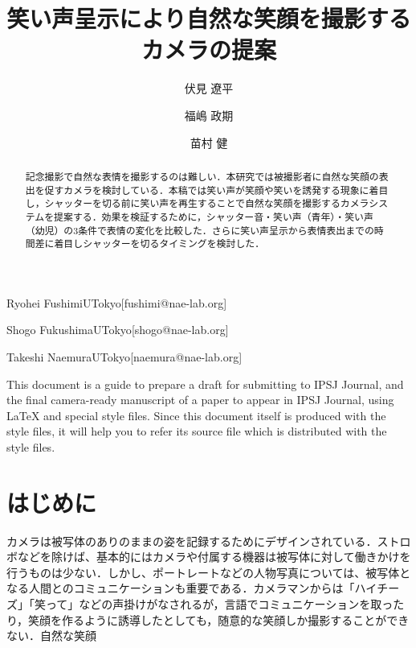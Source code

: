 \documentclass[submit,techreq]{ec2014}
\begin{document}
\title{笑い声呈示により自然な笑顔を撮影するカメラの提案}


\author{伏見 遼平}{Ryohei Fushimi}{UTokyo}[fushimi@nae-lab.org]
\author{福嶋 政期}{Shogo Fukushima}{UTokyo}[shogo@nae-lab.org]
\author{苗村 健}{Takeshi Naemura}{UTokyo}[naemura@nae-lab.org]

\begin{abstract}
記念撮影で自然な表情を撮影するのは難しい．本研究では被撮影者に自然な笑顔の表出を促すカメラを検討している．本稿では笑い声が笑顔や笑いを誘発する現象に着目し，シャッターを切る前に笑い声を再生することで自然な笑顔を撮影するカメラシステムを提案する．効果を検証するために，シャッター音・笑い声（青年）・笑い声（幼児）の3条件で表情の変化を比較した．さらに笑い声呈示から表情表出までの時間差に着目しシャッターを切るタイミングを検討した．
\end{abstract}


%
\begin{eabstract}
This document is a guide to prepare a draft for submitting to IPSJ
Journal, and the final camera-ready manuscript of a paper to appear in
IPSJ Journal, using {\LaTeX} and special style files.  Since this
document itself is produced with the style files, it will help you to
refer its source file which is distributed with the style files.
\end{eabstract}





\maketitle

\section{はじめに}

カメラは被写体のありのままの姿を記録するためにデザインされている．ストロボなどを除けば、基本的にはカメラや付属する機器は被写体に対して働きかけを行うものは少ない．しかし、ポートレートなどの人物写真については、被写体となる人間とのコミュニケーションも重要である．カメラマンからは「ハイチーズ」「笑って」などの声掛けがなされるが，言語でコミュニケーションを取ったり，笑顔を作るように誘導したとしても，随意的な笑顔しか撮影することができない．自然な笑顔
\end{document}
